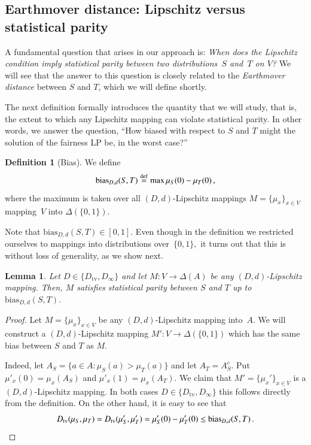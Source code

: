 \documentclass[letterpaper,11pt]{article}
\newtheorem{lemma}[theorem]{Lemma}%
\theoremstyle{definition}
\newtheorem{definition}{Definition}[section]
\newcommand{\mper}{\,.}
\newcommand{\mcom}{\,,}
\newcommand{\defeq}{\stackrel{\small \mathrm{def}}{=}}
\newcommand{\tv}{\mathrm{tv}}
\newcommand\bias{\mathrm{bias}}
\newcommand\dtoD{D,d}
\begin{document}
\subsection{Earthmover distance: Lipschitz versus statistical parity}

A fundamental question that arises in our approach is:
\emph{When does the Lipschitz
condition imply statistical parity between two
distributions~$S$ and~$T$ on $V$?}
%
We will see that the answer to this question is closely  related to the
\emph{Earthmover distance} between $S$ and $T$, which we will define shortly.

The next definition formally introduces the quantity that we will
study, that is, the extent to which any Lipschitz mapping can
violate statistical parity.
In other words, we answer the question,
``How biased with respect to $S$ and $T$ might the solution of the
fairness LP be, in the worst case?''
%
\begin{definition}[Bias]
We define
\begin{equation}
\bias_{\dtoD}(S,T)\defeq\max \mu_S(0)-\mu_T(0)\mcom
\end{equation}
where the maximum is taken over all $(\dtoD)$-Lipschitz mappings
$M=\{\mu_x\}_{x\in V}$ mapping~$V$ into $\Delta(\{0,1\}).$
\end{definition}

Note that $\bias_{\dtoD}(S,T)\in[0,1].$ Even though in the definition
we restricted ourselves to mappings into distributions over~$\{0,1\},$
it turns out that this is without loss of generality, as we show next.
%

\begin{lemma}
\label{lem:zo}
Let $D\in\{D_\tv,D_\infty\}$ and let
$M\colon V\to\Delta(A)$ be any $(\dtoD)$-Lipschitz mapping. Then,
$M$ satisfies statistical parity between $S$ and $T$ up to $\bias_{\dtoD}(S,T).$
\end{lemma}
\begin{proof}
Let $M=\{\mu_x\}_{x\in V}$ be any $(\dtoD)$-Lipschitz mapping into~$A.$
We will construct a $(\dtoD)$-Lipschitz mapping $M'\colon
V\to\Delta(\{0,1\})$ which has the same bias between $S$ and $T$ as $M.$

Indeed, let $A_S=\{a\in A\colon \mu_S(a)>\mu_T(a)\}$ and let $A_T=A_S^c.$ Put
$\mu'_x(0)=\mu_x(A_S)$ and $\mu'_x(1)=\mu_x(A_T).$
We claim that $M'=\{\mu_x'\}_{x\in V}$ is a $(\dtoD)$-Lipschitz mapping.
In both cases $D\in\{D_\tv,D_\infty\}$ this follows directly from the
definition.
%
On the other hand, it is easy to see that
\[
D_\tv(\mu_S,\mu_T)=D_\tv(\mu'_S,\mu'_{T})=\mu'_S(0)-\mu'_T(0)\le
\bias_{\dtoD}(S,T)\mper
\qedhere
\]
\end{proof}
\end{document}
